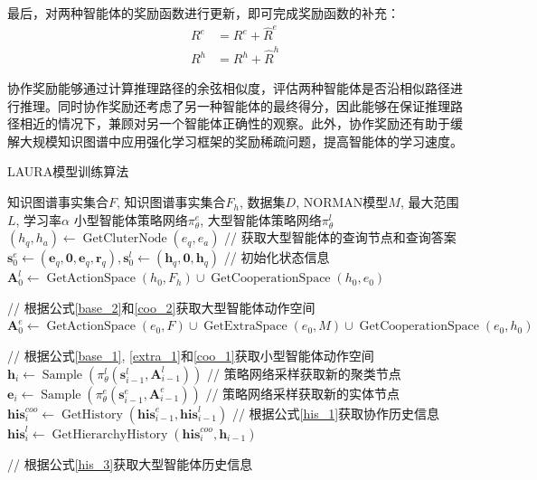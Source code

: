 \documentclass[algorithmlist, AutoFakeBold, AutoFakeSlant, figurelist, tablelist, nomlist, engineering]{seuthesix}
\begin{document}
最后，对两种智能体的奖励函数进行更新，即可完成奖励函数的补充：
\begin{equation}
  \begin{aligned}
    R^e &= R^e + \hat{R}^e \\
    R^h &= R^h + \hat{R}^h
  \end{aligned}
  \label{similar_reward}
\end{equation}

协作奖励能够通过计算推理路径的余弦相似度，评估两种智能体是否沿相似路径进行推理。同时协作奖励还考虑了另一种智能体的最终得分，因此能够在保证推理路径相近的情况下，兼顾对另一个智能体正确性的观察。此外，协作奖励还有助于缓解大规模知识图谱中应用强化学习框架的奖励稀疏问题，提高智能体的学习速度。

\begin{algorithm}[H]
	\caption{LAURA模型训练算法}  
	\label{algorithm_dualagent}
	\begin{algorithmic}[1]
  \Require 知识图谱事实集合$F$, 知识图谱事实集合$F_h$, 数据集$D$, NORMAN模型$M$, 最大范围$L$, 学习率$\alpha$
  \Ensure 小型智能体策略网络$\pi_\theta^e$, 大型智能体策略网络$\pi_\theta^l$
  \State $(h_q, h_a) \leftarrow \operatorname{GetCluterNode}(e_q, e_a)$ // 获取大型智能体的查询节点和查询答案
  \State $\bm{s}_{0}^{e} \leftarrow (\bm{e}_q, \bm{0}, \bm{e}_q, \bm{r}_q), \bm{s}_{0}^{l} \leftarrow (\bm{h}_q, \bm{0}, \bm{h}_q)$ // 初始化状态信息
  \State $\bm{A}_{0}^{l} \leftarrow \operatorname{GetActionSpace}(h_0, F_h) \cup \operatorname{GetCooperationSpace}(h_0, e_0)$ \par\quad// 根据公式\ref{base_2}和\ref{coo_2}获取大型智能体动作空间
  \State $\bm{A}_{0}^{e} \leftarrow \operatorname{GetActionSpace}(e_0, F) \cup \operatorname{GetExtraSpace}(e_0, M) \cup \operatorname{GetCooperationSpace}(e_0, h_0)$ \par\quad// 根据公式\ref{base_1}, \ref{extra_1}和\ref{coo_1}获取小型智能体动作空间
  \State $\bm{h}_i \leftarrow \operatorname{Sample}(\pi_\theta^l(\bm{s}_{i-1}^{l}, \bm{A}_{i-1}^{l}))$ // 策略网络采样获取新的聚类节点
  \State $\bm{e}_i \leftarrow \operatorname{Sample}(\pi_\theta^e(\bm{s}_{i-1}^{e}, \bm{A}_{i-1}^{e}))$ // 策略网络采样获取新的实体节点
  \State $\bm{his}_{i}^{coo} \leftarrow \operatorname{GetHistory}(\bm{his}_{i-1}^{e}, \bm{his}_{i-1}^{l})$ // 根据公式\ref{his_1}获取协作历史信息
  \State $\bm{his}_{i}^{l} \leftarrow \operatorname{GetHierarchyHistory}(\bm{his}_{i}^{coo}, \bm{h}_{i-1})$ \par\quad\quad // 根据公式\ref{his_3}获取大型智能体历史信息

\end{algorithmic}
\end{algorithm}
\end{document}
